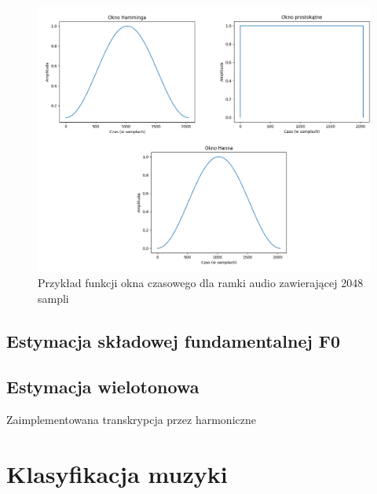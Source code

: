 \documentclass[12pt,a4paper,twoside]{mwart}
\begin{document}
\begin{figure}[H]
  \begin{center}
    \includegraphics[scale=1.4]{images/WindowFunctions.png}
    \caption{Przykład funkcji okna czasowego dla ramki audio zawierającej 2048 sampli}
  \end{center}
\end{figure}
\newpage

\subsection{Estymacja składowej fundamentalnej F0}
\newpage

\subsection{Estymacja wielotonowa}
Zaimplementowana transkrypcja przez harmoniczne

\newpage
\section{Klasyfikacja muzyki}
\cite{DBLP:journals/corr/abs-1708-03535}\cite{DBLP:journals/corr/XiongDHSSSYZ16a}
\end{document}
